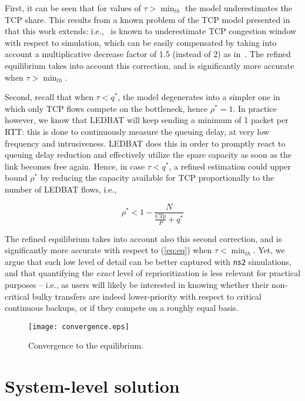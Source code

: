 \documentclass[conference]{IEEEtran}
\newcommand{\secL}[1]{\label{sec:#1}}
\newcommand{\eqR}[1]{(\ref{eq:#1})}
\newcommand{\figLC}[2]{
		\caption{#2}
		\label{fig:#1}
}
\begin{document}
First, it can be seen that for values of $\tau>\min_{th}$ the model underestimates the TCP share. This results from a known  problem of the TCP model presented in ~\cite{liu03sigmetrics} that  this work extends: i.e.,~\cite{liu03sigmetrics} is known to underestimate TCP congestion window with respect to simulation, which can be easily compensated by taking into account a multiplicative decrease factor of 1.5 (instead of 2) as in~\cite{liu03sigmetrics}.
The refined equilibrium takes into account this correction, and is significantly more accurate when $\tau>\min_{th}$.

Second, recall that when $\tau < q^*$, the model degenerates into a simpler one in which only TCP flows compete on the bottleneck, hence $\rho^*=1$. In practice however, we know that LEDBAT will keep sending a minimum of 1 packet per RTT: this is done to continuously measure the queuing delay, at very low frequency and intrusiveness. LEDBAT does this in order to promptly react to queuing delay reduction and effectively utilize the spare capacity as soon as the link becomes free again. Hence, in case $\tau < q^*$, a refined estimation could upper bound $\rho^*$ by reducing the capacity available for TCP proportionally to the number of LEDBAT flows, i.e.,  

\[\rho^*< 1 - \frac{N}{\frac{C Tp}{P} + q^*} \]

The refined equilibrium takes into account also this second correction, and is significantly more accurate with respect to \eqR{eq} when  $\tau<\min_{th}$. Yet, we argue that such low level of detail can be better captured with \verb!ns2! simulations, and that quantifying the \emph{exact} level of reprioritization is less relevant for practical purposes -- i.e., as users will likely be interested in knowing whether their non-critical bulky transfers are indeed lower-priority with respect to critical continuous backups, or if they compete on a roughly equal basis.








\begin{figure}[t]
    \begin{center}
        \texttt{[image: convergence.eps]}
        \figLC{convergence}{Convergence to the equilibrium.}
    \end{center}
\end{figure}



\section{System-level solution}\secL{system}
\end{document}
